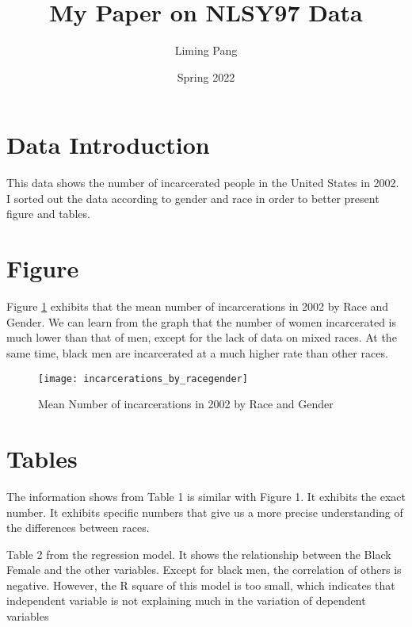 \documentclass{article}
\author{Liming Pang}
\title{My Paper on NLSY97 Data}
\date{Spring 2022}
\begin{document}
\maketitle

\section{Data Introduction}

This data shows the number of incarcerated people in the United States in 2002. I sorted out the data according to gender and race in order to better present figure and tables.

\section{Figure}
Figure \ref{fig:graph} exhibits that the mean number of incarcerations in 2002 by Race and Gender. We can learn from the graph that the number of women incarcerated is much lower than that of men, except for the lack of data on mixed races. At the same time, black men are incarcerated at a much higher rate than other races.

\begin{figure}[H]
    \begin{center}
        \texttt{[image: incarcerations\_by\_racegender]}
    \end{center}
    \caption{Mean Number of incarcerations in 2002 by Race and Gender}
    \label{fig:graph}
\end{figure}

\section{Tables}
The information shows from Table 1 is similar with Figure 1. It exhibits the exact number. It exhibits specific numbers that give us a more precise understanding of the differences between races.

Table 2 from the regression model. It shows the relationship between the Black Female and the other variables. Except for black men, the correlation of others is negative. However, the R square of this model is too small, which indicates that  independent variable is not explaining much in the variation of dependent variables

\end{document}
